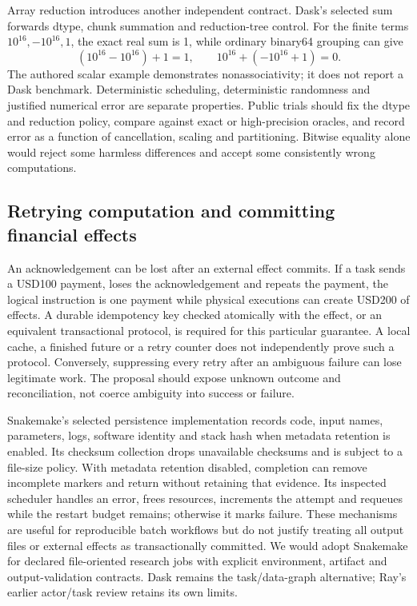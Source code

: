 Array reduction introduces another independent contract. Dask's selected sum forwards dtype, chunk summation and reduction-tree control. For the finite terms $10^{16},-10^{16},1$, the exact real sum is 1, while ordinary binary64 grouping can give
\[
 (10^{16}-10^{16})+1=1,\qquad
 10^{16}+(-10^{16}+1)=0.
\]
The authored scalar example demonstrates nonassociativity; it does not report a Dask benchmark. Deterministic scheduling, deterministic randomness and justified numerical error are separate properties. Public trials should fix the dtype and reduction policy, compare against exact or high-precision oracles, and record error as a function of cancellation, scaling and partitioning. Bitwise equality alone would reject some harmless differences and accept some consistently wrong computations.~\citep{exec25_dww_dask,exec25_dww_choice}

\subsection{Retrying computation and committing financial effects}

An acknowledgement can be lost after an external effect commits. If a task sends a USD100 payment, loses the acknowledgement and repeats the payment, the logical instruction is one payment while physical executions can create USD200 of effects. A durable idempotency key checked atomically with the effect, or an equivalent transactional protocol, is required for this particular guarantee. A local cache, a finished future or a retry counter does not independently prove such a protocol. Conversely, suppressing every retry after an ambiguous failure can lose legitimate work. The proposal should expose unknown outcome and reconciliation, not coerce ambiguity into success or failure.~\citep{exec25_dww_choice}

Snakemake's selected persistence implementation records code, input names, parameters, logs, software identity and stack hash when metadata retention is enabled. Its checksum collection drops unavailable checksums and is subject to a file-size policy. With metadata retention disabled, completion can remove incomplete markers and return without retaining that evidence. Its inspected scheduler handles an error, frees resources, increments the attempt and requeues while the restart budget remains; otherwise it marks failure. These mechanisms are useful for reproducible batch workflows but do not justify treating all output files or external effects as transactionally committed. We would adopt Snakemake for declared file-oriented research jobs with explicit environment, artifact and output-validation contracts. Dask remains the task/data-graph alternative; Ray's earlier actor/task review retains its own limits.~\citep{exec25_dww_snakemake,exec24_ray_sources,exec24_ray_contract}

